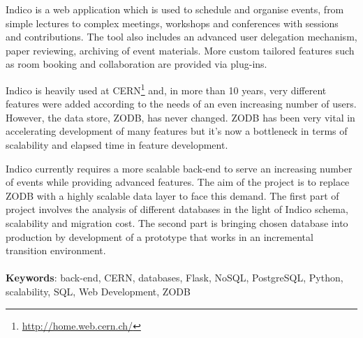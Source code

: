 \begin{abstracts}

\par Indico is a web application which is used to schedule and organise events, from simple lectures to complex meetings, workshops and conferences with sessions and contributions. The tool also includes an advanced user delegation mechanism, paper reviewing, archiving of event materials. More custom tailored features such as room booking and collaboration are provided via plug-ins.
\\
\par Indico is heavily used at \textsc{CERN}\footnote{\url{http://home.web.cern.ch/}} and, in more than 10 years, very different features were added according to the needs of an even increasing number of users. However, the data store, \textsc{ZODB}, has never changed. \textsc{ZODB} has been very vital in accelerating development of many features but it's now a bottleneck in terms of scalability and elapsed time in feature development.
\\
\par Indico currently requires a more scalable back-end to serve an increasing number of events while providing advanced features. The aim of the project is to replace \textsc{ZODB} with a highly scalable data layer to face this demand. The first part of project involves the analysis of different databases in the light of Indico schema, scalability and migration cost. The second part is bringing chosen database into production by development of a prototype that works in an incremental transition environment.
\\
\\
\textbf{Keywords}: back-end, CERN, databases, Flask, NoSQL, PostgreSQL, Python, scalability, SQL, Web Development, ZODB

\end{abstracts}
